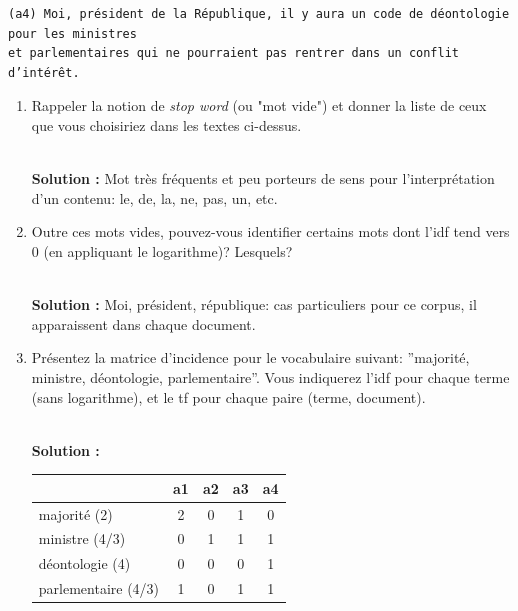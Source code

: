 \documentclass[11pt,a4paper]{article}
\newenvironment{solution}[0]{
~\\ \color{red} \textbf{Solution :}\color{black}}{%
}
\begin{document}
\begin{small}
\begin{verbatim}
(a4) Moi, président de la République, il y aura un code de déontologie  pour les ministres 
et parlementaires qui ne pourraient pas rentrer dans un conflit d’intérêt.
\end{verbatim}
\end{small}

\begin{enumerate}
  \item Rappeler la notion de \textit{stop word} (ou "mot vide") et donner la liste
         de ceux que vous choisiriez dans les textes ci-dessus.
         
         
\begin{solution}
Mot très fréquents et peu porteurs de sens pour l'interprétation d'un contenu: le, de, la,
ne, pas, un, etc.
\end{solution}

  \item Outre ces mots vides, pouvez-vous identifier certains mots dont l'idf tend vers 0 (en appliquant le logarithme)? Lesquels?  
  
           
\begin{solution}
Moi, président, république: cas particuliers pour ce corpus, il apparaissent dans chaque document.
\end{solution}

  \item Présentez la matrice d'incidence pour le vocabulaire suivant:  ''majorité, ministre, déontologie, parlementaire''.
  Vous indiquerez  l'idf pour chaque terme (sans logarithme), et le tf pour chaque paire (terme, document). 


\begin{solution}
  
\begin{center}
\begin{tabular}{l|c|c|c|c}
       & \textbf{a1} & \textbf{a2} & \textbf{a3} &\textbf{a4} \\ \hline  
   majorité (2) & 2 & 0 & 1 & 0 \\
   ministre (4/3) & 0 & 1 &  1 & 1\\
   déontologie (4) & 0 & 0 & 0 & 1\\
   parlementaire (4/3) & 1 & 0 & 1 & 1 \\ \hline
   \end{tabular}
\end{center}

\end{solution}


\end{enumerate}
\end{document}
